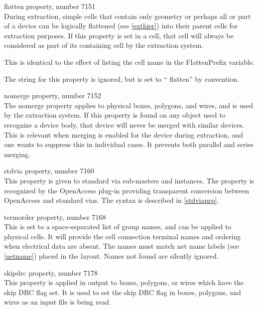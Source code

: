 \begin{description}
\item{\et flatten} property, number 7151\\
During extraction, simple cells that contain only geometry or perhaps
all or part of a device can be logically flattened (see \ref{exthier})
into their parent cells for extraction purposes.  If this property is
set in a cell, that cell will always be considered as part of its
containing cell by the extraction system.

This is identical to the effect of listing the cell name in the {\et
FlattenPrefix} variable.

The string for this property is ignored, but is set to ``{\vt
flatten}'' by convention.

\item{\et nomerge} property, number 7152\\
The {\et nomerge} property applies to physical boxes, polygons, and
wires, and is used by the extraction system.  If this property is
found on any object used to recognize a device body, that device will
never be merged with similar devices.  This is relevant when merging
is enabled for the device during extraction, and one wants to suppress
this in individual cases.  It prevents both parallel and series
merging.

\item{\et stdvia} property, number 7160\\
This property is given to standard via sub-masters and instances.
\ifoa
The property is recognized by the OpenAccess plug-in providing
transparent conversion between OpenAccess and {\Xic} standard vias.
\fi
The syntax is described in \ref{stdviaprp}.

\item{\et termorder} property, number 7168\\
This is set to a space-separated list of group names, and can be
applied to physical cells.  It will provide the cell connection
terminal names and ordering when electrical data are absent.  The
names must match net name labels (see \ref{netname}) placed in the
layout.  Names not found are silently ignored.

\item{\et skipdrc} property, number 7178\\
This property is applied in output to boxes, polygons, or wires which
have the {\cb skip DRC} flag set.  It is used to set the {\cb skip
DRC} flag in boxes, polygons, and wires as an input file is being
read.


\end{description}
